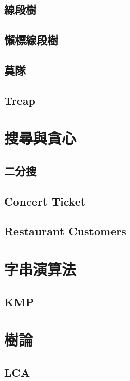 \subsection{線段樹}

\subsection{懶標線段樹}

\subsection{莫隊}

\subsection{Treap}


\section{搜尋與貪心}
\subsection{二分搜} 

\subsection{Concert Ticket}

\subsection{Restaurant Customers}


\section{字串演算法}
\subsection{KMP} 


\section{樹論}
\subsection{LCA} 

